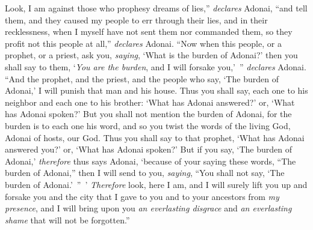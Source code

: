 \begin{biblechapter}
\verse Look, I am against those who prophesy dreams of lies,” \textit{declares} Adonai, “and tell them, and they caused my people to err through their lies, and in their recklessness, when I myself have not sent them nor commanded them, so they profit not this people at all,” \textit{declares} Adonai.
\verse “Now when this people, or a prophet, or a priest, ask you, \textit{saying}, ‘What is the burden of Adonai?’ then you shall say to them, ‘\textit{You are the burden}, and I will forsake you,’ ” \textit{declares} Adonai.
\verse “And the prophet, and the priest, and the people who say, ‘The burden of Adonai,’ I will punish that man and his house.
\verse Thus you shall say, each one to his neighbor and each one to his brother: ‘What has Adonai answered?’ or, ‘What has Adonai spoken?’
\verse But you shall not mention the burden of Adonai, for the burden is to each one his word, and so you twist the words of the living God, Adonai of hosts, our God.
\verse Thus you shall say to that prophet, ‘What has Adonai answered you?’ or, ‘What has Adonai spoken?’
\verse But if you say, ‘The burden of Adonai,’ \textit{therefore} thus says Adonai, ‘because of your saying these words, “The burden of Adonai,” then I will send to you, \textit{saying}, “You shall not say, ‘The burden of Adonai.’ ” ’
\verse \textit{Therefore} look, here I am, and I will surely lift you up and forsake you and the city that I gave to you and to your ancestors from \textit{my presence},
\verse and I will bring upon you \textit{an everlasting disgrace} and \textit{an everlasting shame} that will not be forgotten.”
\end{biblechapter}

